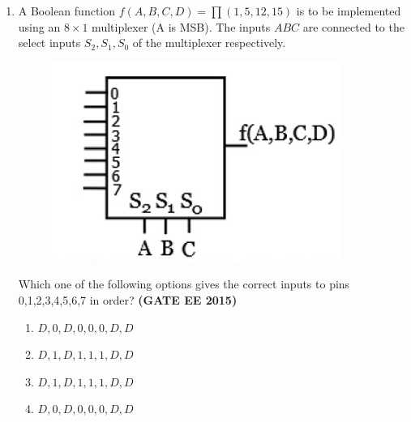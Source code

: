 \documentclass[a4paper,12pt]{exam}
\theoremstyle{remark}
\begin{document}
\begin{enumerate}
\begin{multicols}{4}
    \begin{enumerate}
        \item 00
        \item 01
        \item 10
        \item 11
    \end{enumerate}
\end{multicols}
\item A Boolean function $f(A,B,C,D) = \prod(1,5,12,15)$ is to be implemented using an $8 \times 1$ multiplexer (A is MSB). The inputs $ABC$ are connected to the select inputs $S_2, S_1, S_0$ of the multiplexer respectively.
\begin{figure}[H]
    \centering
    \includegraphics[width=0.5\columnwidth]{figs/2Q 48.png}
    \caption{}
    \label{fig:placeholder}
\end{figure}
Which one of the following options gives the correct inputs to pins 0,1,2,3,4,5,6,7 in order? \hfill{\textbf{(GATE EE 2015)}}
    \begin{enumerate}
        \item $D, 0, D, 0, 0, 0, D, D$
        \item $D, 1, D, 1, 1, 1, D, D$
        \item $D, 1, D, 1, 1, 1, D, D$
        \item $D, 0, D, 0, 0, 0, D, D$
    \end{enumerate}


\end{enumerate}
\end{document}
